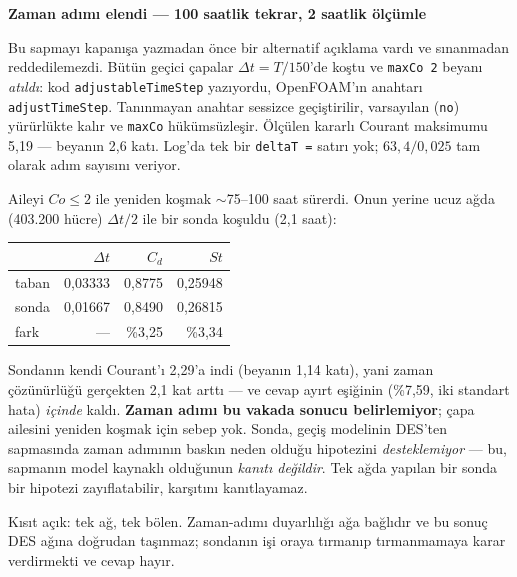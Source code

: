 \documentclass[11pt,a4paper]{article}
\newcommand{\kkkenar}{lacivert}
\newcommand{\kkzemin}{kod}
\newenvironment{renkkutu}[3]{%
  \renewcommand{\kkkenar}{#1}\renewcommand{\kkzemin}{#2}%
  \par\medskip\noindent
  \begin{lrbox}{\kutugovde}%
  \begin{minipage}{\dimexpr\linewidth-2\fboxsep-2\fboxrule\relax}\footnotesize
  \textcolor{#1}{\textbf{#3}}\par\vspace{3pt}%
}{%
  \end{minipage}%
  \end{lrbox}%
  \noindent\fcolorbox{\kkkenar}{\kkzemin}{\usebox{\kutugovde}}%
  \par\medskip
}
\newenvironment{dikkat}[1]{\begin{renkkutu}{orta}{ortabg}{#1}}{\end{renkkutu}}
\begin{document}
\begin{dikkat}{Zaman adımı elendi --- 100 saatlik tekrar, 2 saatlik ölçümle}
Bu sapmayı kapanışa yazmadan önce bir alternatif açıklama vardı ve
sınanmadan reddedilemezdi. Bütün geçici çapalar $\Delta t = T/150$'de koştu ve
\texttt{maxCo 2} beyanı \emph{atıldı}: kod \texttt{adjustableTimeStep} yazıyordu,
OpenFOAM'ın anahtarı \texttt{adjustTimeStep}. Tanınmayan anahtar sessizce
geçiştirilir, varsayılan (\texttt{no}) yürürlükte kalır ve \texttt{maxCo}
hükümsüzleşir. Ölçülen kararlı Courant maksimumu 5{,}19 --- beyanın 2{,}6 katı.
Log'da tek bir \texttt{deltaT =} satırı yok; $63{,}4/0{,}025$ tam olarak adım
sayısını veriyor.

Aileyi $Co\!\leq\!2$ ile yeniden koşmak $\sim$75--100 saat sürerdi. Onun
yerine ucuz ağda (403.200 hücre) $\Delta t/2$ ile bir sonda koşuldu (2{,}1 saat):

\begin{center}\footnotesize
\begin{tabular}{@{}lrrr@{}}
\toprule
 & $\Delta t$ & $C_d$ & $St$ \\
\midrule
taban  & 0{,}03333 & 0{,}8775 & 0{,}25948 \\
sonda  & 0{,}01667 & 0{,}8490 & 0{,}26815 \\
\midrule
fark   & --- & \%3{,}25 & \%3{,}34 \\
\bottomrule
\end{tabular}
\end{center}

\noindent Sondanın kendi Courant'ı 2{,}29'a indi (beyanın 1{,}14 katı), yani
zaman çözünürlüğü gerçekten 2{,}1 kat arttı --- ve cevap ayırt eşiğinin
(\%7{,}59, iki standart hata) \emph{içinde} kaldı. \textbf{Zaman adımı bu
vakada sonucu belirlemiyor}; çapa ailesini yeniden koşmak için sebep yok.
Sonda, geçiş modelinin DES'ten sapmasında zaman adımının baskın neden
olduğu hipotezini \emph{desteklemiyor} --- bu, sapmanın model kaynaklı
olduğunun \emph{kanıtı değildir}. Tek ağda yapılan bir sonda bir
hipotezi zayıflatabilir, karşıtını kanıtlayamaz.

Kısıt açık: tek ağ, tek bölen. Zaman-adımı duyarlılığı ağa bağlıdır ve bu
sonuç DES ağına doğrudan taşınmaz; sondanın işi oraya tırmanıp tırmanmamaya
karar verdirmekti ve cevap hayır.
\end{dikkat}
\end{document}
